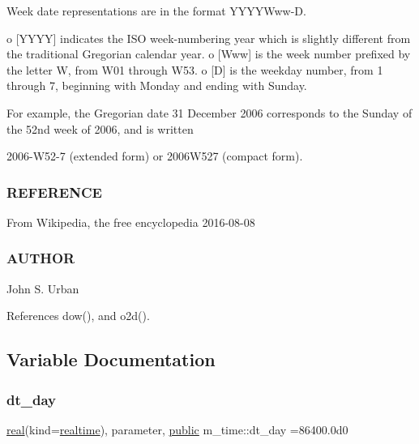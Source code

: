 \begin{DoxyVerb}
Week date representations are in the format Y\+Y\+Y\+Y\+Www-\/D.

o \mbox{[}Y\+Y\+YY\mbox{]} indicates the I\+SO week-\/numbering year which is slightly different from the traditional Gregorian calendar year. o \mbox{[}Www\mbox{]} is the week number prefixed by the letter W, from W01 through W53. o \mbox{[}D\mbox{]} is the weekday number, from 1 through 7, beginning with Monday and ending with Sunday.

For example, the Gregorian date 31 December 2006 corresponds to the Sunday of the 52nd week of 2006, and is written

2006-\/\+W52-\/7 (extended form) or 2006\+W527 (compact form).

\subsubsection*{R\+E\+F\+E\+R\+E\+N\+CE}

From Wikipedia, the free encyclopedia 2016-\/08-\/08

\subsubsection*{A\+U\+T\+H\+OR}

John S. Urban 

References dow(), and o2d().



\subsection{Variable Documentation}
\mbox{\label{namespacem__time_a97725f8d657c24badff19a794f323a6b}} 
\subsubsection{\texorpdfstring{dt\+\_\+day}{dt\_day}}
{\footnotesize\ttfamily \hyperlink{read__watch_83_8txt_abdb62bde002f38ef75f810d3a905a823}{real}(kind=\hyperlink{namespacem__time_ac10ea9e8d59ec74eaa7d89f2517d7422}{realtime}), parameter, \hyperlink{M__stopwatch_83_8txt_a2f74811300c361e53b430611a7d1769f}{public} m\+\_\+time\+::dt\+\_\+day =86400.\+0d0}

\mbox{\label{namespacem__time_aa0ca2172092f5e7dcc9b8524e6516fd8}} 

\end{DoxyVerb}
